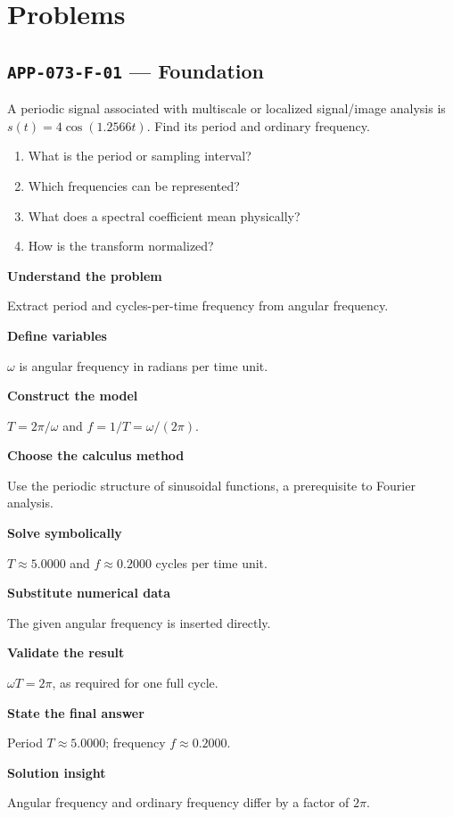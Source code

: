 \documentclass[11pt]{book}
\newcommand{\pid}[1]{\texttt{#1}}
\begin{document}
\section*{Problems}
\subsection*{\pid{APP-073-F-01} — Foundation}
\begin{problembox}
A periodic signal associated with multiscale or localized signal/image analysis is $s(t)=4\cos(1.2566t)$. Find its period and ordinary frequency.
\end{problembox}
\begin{promptbox}\begin{enumerate}
\item What is the period or sampling interval?
\item Which frequencies can be represented?
\item What does a spectral coefficient mean physically?
\item How is the transform normalized?
\end{enumerate}\end{promptbox}
\begin{solutionbox}
\textbf{Understand the problem}\par Extract period and cycles-per-time frequency from angular frequency.\par\medskip
\textbf{Define variables}\par $\omega$ is angular frequency in radians per time unit.\par\medskip
\textbf{Construct the model}\par $T=2\pi/\omega$ and $f=1/T=\omega/(2\pi)$.\par\medskip
\textbf{Choose the calculus method}\par Use the periodic structure of sinusoidal functions, a prerequisite to Fourier analysis.\par\medskip
\textbf{Solve symbolically}\par $T\approx 5.0000$ and $f\approx 0.2000$ cycles per time unit.\par\medskip
\textbf{Substitute numerical data}\par The given angular frequency is inserted directly.\par\medskip
\textbf{Validate the result}\par $\omega T=2\pi$, as required for one full cycle.\par\medskip
\textbf{State the final answer}\par Period $T\approx 5.0000$; frequency $f\approx 0.2000$.\par\medskip
\textbf{Solution insight}\par Angular frequency and ordinary frequency differ by a factor of $2\pi$.\par\medskip
\end{solutionbox}
\end{document}
